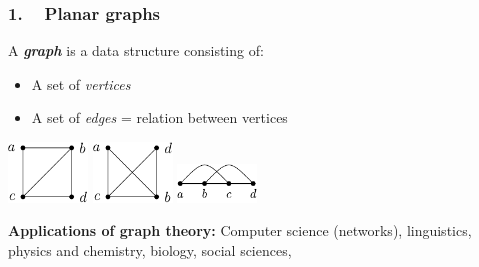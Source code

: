 

\begin{frame}
\frametitle{1. ~ Planar graphs}


A \emph{\bfseries graph} is a data structure consisting of:
\begin{itemize}[$\bullet$]
 \item A set of \emph{vertices}
 \item A set of \emph{edges} = relation between vertices
\end{itemize}


\bigskip \bigskip \pause
\begin{center}
\includegraphics[width=60pt]{images/image-78.pdf} \hspace{30pt}
\includegraphics[width=60pt]{images/image-79.pdf} \hspace{30pt}
\includegraphics[width=60pt]{images/image-80.pdf}
\end{center}

\bigskip \bigskip
\pause
{\bfseries Applications of graph theory:} 
Computer science (networks), linguistics, physics and chemistry, biology, social sciences, \etc{}


\end{frame}



